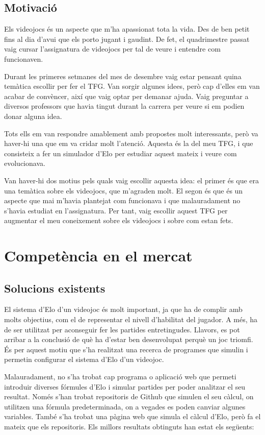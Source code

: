 \documentclass[a4paper]{article}
\begin{document}
\newpage
\subsection{Motivació}
Els videojocs és un aspecte que m'ha apassionat tota la vida. Des de ben petit fins al dia d'avui que els porto jugant i gaudint. De fet, el quadrimestre passat vaig cursar l'assignatura de videojocs per tal de veure i entendre com funcionaven.

Durant les primeres setmanes del mes de desembre vaig estar pensant quina temàtica escollir per fer el TFG. Van sorgir algunes idees, però cap d'elles em van acabar de convèncer, així que vaig optar per demanar ajuda. Vaig preguntar a diversos professors que havia tingut durant la carrera per veure si em podien donar alguna idea.

Tots ells em van respondre amablement amb propostes molt interessants, però va haver-hi una que em va cridar molt l'atenció. Aquesta és la del meu TFG, i que consisteix a fer un simulador d'Elo per estudiar aquest mateix i veure com evolucionava.

Van haver-hi dos motius pels quals vaig escollir aquesta idea: el primer és que era una temàtica sobre els videojocs, que m'agraden molt. El segon és que és un aspecte que mai m'havia plantejat com funcionava i que malauradament no s'havia estudiat en l'assignatura. Per tant, vaig escollir aquest TFG per augmentar el meu coneixement sobre els videojocs i sobre com estan fets.


\newpage
\section{Competència en el mercat}
\subsection{Solucions existents}
El sistema d'Elo d'un videojoc és molt important, ja que ha de complir amb molts objectius, com el de representar el nivell d'habilitat del jugador. A més, ha de ser utilitzat per aconseguir fer les partides entretingudes. Llavors, es pot arribar a la conclusió de què ha d'estar ben desenvolupat perquè un joc triomfi. És per aquest motiu que s'ha realitzat una recerca de programes que simulin i permetin configurar el sistema d'Elo d'un videojoc.

Malauradament, no s'ha trobat cap programa o aplicació web que permeti introduir diverses fórmules d'Elo i simular partides per poder analitzar el seu resultat. Només s'han trobat repositoris de Github que simulen el seu càlcul, on utilitzen una fórmula predeterminada, on a vegades es poden canviar algunes variables. També s'ha trobat una pàgina web que simula el càlcul d'Elo, però fa el mateix que els repositoris. Els millors resultats obtinguts han estat els següents:
\end{document}
